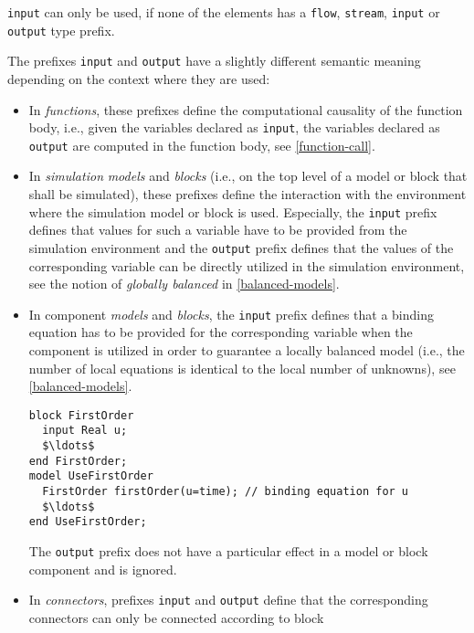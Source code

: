 \begin{example}
\lstinline!input! can only be used, if none of the elements has a \lstinline!flow!, \lstinline!stream!, \lstinline!input! or \lstinline!output! type prefix.
\end{example}

The prefixes \lstinline!input! and \lstinline!output! have a slightly different semantic meaning depending on the context where they are used:
\begin{itemize}
\item
  In \emph{functions}, these prefixes define the computational causality
  of the function body, i.e., given the variables declared as \lstinline!input!, the
  variables declared as \lstinline!output! are computed in the function body, see
  \cref{function-call}.
\item
  In \emph{simulation} \emph{models} and \emph{blocks} (i.e., on the top level of a model or block that shall be simulated), these prefixes define the interaction with the environment where the simulation model or block is used.
  Especially, the \lstinline!input! prefix defines that values for such a variable have to be provided from the simulation environment and the \lstinline!output! prefix defines that the values of the corresponding variable can be directly utilized in the simulation environment, see the notion of \emph{globally balanced} in \cref{balanced-models}.
\item
  In component \emph{models} and \emph{blocks}, the \lstinline!input! prefix defines
  that a binding equation has to be provided for the corresponding
  variable when the component is utilized in order to guarantee a
  locally balanced model (i.e., the number of local equations is
  identical to the local number of unknowns), see \cref{balanced-models}.
\begin{example}
\begin{lstlisting}[language=modelica]
block FirstOrder
  input Real u;
  $\ldots$
end FirstOrder;
model UseFirstOrder
  FirstOrder firstOrder(u=time); // binding equation for u
  $\ldots$
end UseFirstOrder;
\end{lstlisting}
\end{example}
  The \lstinline!output! prefix does not have a particular effect in a model or block
  component and is ignored.
\item
  In \emph{connectors}, prefixes \lstinline!input! and \lstinline!output! define that the
  corresponding connectors can only be connected according to block

\end{itemize}
